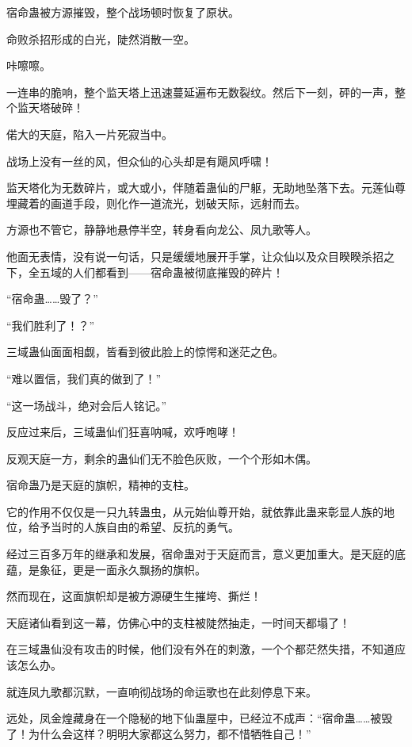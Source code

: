 
\begin{this_body}

宿命蛊被方源摧毁，整个战场顿时恢复了原状。

命败杀招形成的白光，陡然消散一空。

咔嚓嚓。

一连串的脆响，整个监天塔上迅速蔓延遍布无数裂纹。然后下一刻，砰的一声，整个监天塔破碎！

偌大的天庭，陷入一片死寂当中。

战场上没有一丝的风，但众仙的心头却是有飓风呼啸！

监天塔化为无数碎片，或大或小，伴随着蛊仙的尸躯，无助地坠落下去。元莲仙尊埋藏着的画道手段，则化作一道流光，划破天际，远射而去。

方源也不管它，静静地悬停半空，转身看向龙公、凤九歌等人。

他面无表情，没有说一句话，只是缓缓地展开手掌，让众仙以及众目睽睽杀招之下，全五域的人们都看到——宿命蛊被彻底摧毁的碎片！

“宿命蛊……毁了？”

“我们胜利了！？”

三域蛊仙面面相觑，皆看到彼此脸上的惊愕和迷茫之色。

“难以置信，我们真的做到了！”

“这一场战斗，绝对会后人铭记。”

反应过来后，三域蛊仙们狂喜呐喊，欢呼咆哮！

反观天庭一方，剩余的蛊仙们无不脸色灰败，一个个形如木偶。

宿命蛊乃是天庭的旗帜，精神的支柱。

它的作用不仅仅是一只九转蛊虫，从元始仙尊开始，就依靠此蛊来彰显人族的地位，给予当时的人族自由的希望、反抗的勇气。

经过三百多万年的继承和发展，宿命蛊对于天庭而言，意义更加重大。是天庭的底蕴，是象征，更是一面永久飘扬的旗帜。

然而现在，这面旗帜却是被方源硬生生摧垮、撕烂！

天庭诸仙看到这一幕，仿佛心中的支柱被陡然抽走，一时间天都塌了！

在三域蛊仙没有攻击的时候，他们没有外在的刺激，一个个都茫然失措，不知道应该怎么办。

就连凤九歌都沉默，一直响彻战场的命运歌也在此刻停息下来。

远处，凤金煌藏身在一个隐秘的地下仙蛊屋中，已经泣不成声：“宿命蛊……被毁了！为什么会这样？明明大家都这么努力，都不惜牺牲自己！”


\end{this_body}
